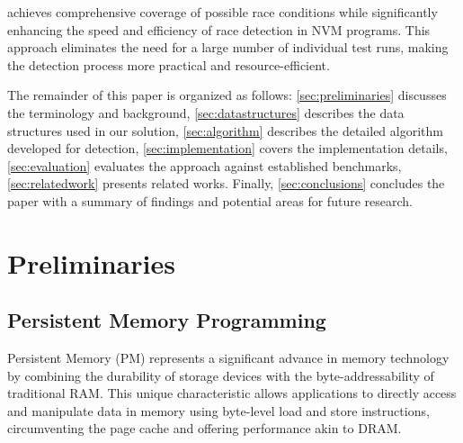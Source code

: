 \documentclass[nonacm,sigplan]{acmart}
\begin{document}
\SignRaceDetector achieves comprehensive coverage of possible race conditions while significantly enhancing the speed and efficiency of race detection in NVM programs. This approach eliminates the need for a large number of individual test runs, making the detection process more practical and resource-efficient.





The remainder of this paper is organized as follows: \autoref{sec:preliminaries} discusses the terminology and background, \autoref{sec:datastructures} describes the data structures used in our solution, \autoref{sec:algorithm} describes the detailed algorithm developed for \NameRace detection, \autoref{sec:implementation} covers the implementation details, \autoref{sec:evaluation} evaluates the approach against established benchmarks, \autoref{sec:relatedwork} presents related works. Finally, \autoref{sec:conclusions} concludes the paper with a summary of findings and potential areas for future research.


\section{Preliminaries}
\label{sec:preliminaries}

\subsection{Persistent Memory Programming}
Persistent Memory (PM) represents a significant advance in memory technology by combining the durability of storage devices with the byte-addressability of traditional RAM. This unique characteristic allows applications to directly access and manipulate data in memory using byte-level load and store instructions, circumventing the page cache and offering performance akin to DRAM.
\end{document}
